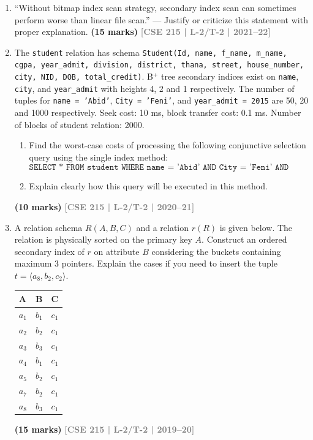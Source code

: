 \documentclass[12pt]{article}
\newcommand{\yr}[1]{\hfill\textcolor{gray}{\small\textbf{[#1]}}}
\newcommand{\mk}[1]{\textcolor{orange!70!black}{\small\textbf{(#1 marks)}}}
\begin{document}
\begin{enumerate}


\item ``Without bitmap index scan strategy, secondary index scan can sometimes perform worse than linear file scan.'' --- Justify or criticize this statement with proper explanation.
\mk{15} \yr{CSE 215 | L-2/T-2 | 2021--22}


\item The \texttt{student} relation has schema \texttt{Student(Id, name, f\_name, m\_name, cgpa, year\_admit, division, district, thana, street, house\_number, city, NID, DOB, total\_credit)}. B$^+$ tree secondary indices exist on \texttt{name}, \texttt{city}, and \texttt{year\_admit} with heights 4, 2 and 1 respectively. The number of tuples for \texttt{name = 'Abid'}, \texttt{City = 'Feni'}, and \texttt{year\_admit = 2015} are 50, 20 and 1000 respectively. Seek cost: 10 ms, block transfer cost: 0.1 ms. Number of blocks of student relation: 2000.
\begin{enumerate}
  \item Find the worst-case costs of processing the following conjunctive selection query using the single index method:
  \[\texttt{SELECT * FROM student WHERE name = 'Abid' AND City = 'Feni' AND year\_admit = 2015}\]
  \item Explain clearly how this query will be executed in this method.
\end{enumerate}
\mk{10} \yr{CSE 215 | L-2/T-2 | 2020--21}


\item A relation schema $R(A, B, C)$ and a relation $r(R)$ is given below. The relation is physically sorted on the primary key $A$. Construct an ordered secondary index of $r$ on attribute $B$ considering the buckets containing maximum 3 pointers. Explain the cases if you need to insert the tuple $t = \langle a_8, b_2, c_2 \rangle$.

\medskip
\begin{center}
\small
\begin{tabular}{lll}
\toprule
\textbf{A} & \textbf{B} & \textbf{C}\\
\midrule
$a_1$ & $b_1$ & $c_1$\\
$a_2$ & $b_2$ & $c_1$\\
$a_3$ & $b_3$ & $c_1$\\
$a_4$ & $b_1$ & $c_1$\\
$a_5$ & $b_2$ & $c_1$\\
$a_7$ & $b_2$ & $c_1$\\
$a_8$ & $b_3$ & $c_1$\\
\bottomrule
\end{tabular}
\end{center}
\mk{15} \yr{CSE 215 | L-2/T-2 | 2019--20}



\end{enumerate}
\end{document}

